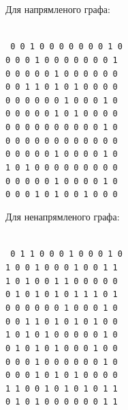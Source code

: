 \begin{minipage}[t]{0.4\linewidth}
  \begin{framed}
    \noindent%
    Для напрямленого графа:\\\\
    \raggedright\footnotesize\texttt{%
      0 0 1 0 0 0 0 0 0 0 1 0\\
      0 0 0 1 0 0 0 0 0 0 0 1\\
      0 0 0 0 0 1 0 0 0 0 0 0\\
      0 0 1 1 0 1 0 1 0 0 0 0\\
      0 0 0 0 0 0 1 0 0 0 1 0\\
      0 0 0 0 0 1 0 1 0 0 0 0\\
      0 0 0 0 0 0 0 0 0 0 1 0\\
      0 0 0 0 0 0 0 0 0 0 0 0\\
      0 0 0 0 0 1 0 0 0 0 1 0\\
      1 0 1 0 0 0 0 0 0 0 0 0\\
      0 0 0 0 0 1 0 0 0 0 1 0\\
      0 0 0 1 0 1 0 0 1 0 0 0\\
    }
  \end{framed}
\end{minipage}
\hfill
\begin{minipage}[t]{0.4\linewidth}
  \begin{framed}
    \noindent%
    Для ненапрямленого графа:\\\\
    \raggedright\footnotesize\texttt{%
      0 1 1 0 0 0 1 0 0 0 1 0\\
      1 0 0 1 0 0 0 1 0 0 1 1\\
      1 0 1 0 0 1 1 0 0 0 0 0\\
      0 1 0 1 0 1 0 1 1 1 0 1\\
      0 0 0 0 0 0 1 0 0 0 1 0\\
      0 0 1 1 0 1 0 1 0 1 0 0\\
      1 0 1 0 1 0 0 0 0 0 1 0\\
      0 1 0 1 0 1 0 0 0 1 0 0\\
      0 0 0 1 0 0 0 0 0 0 1 0\\
      0 0 0 1 0 1 0 1 0 0 0 0\\
      1 1 0 0 1 0 1 0 1 0 1 1\\
      0 1 0 1 0 0 0 0 0 0 1 1\\
    }
  \end{framed}
\end{minipage}
\hfill

